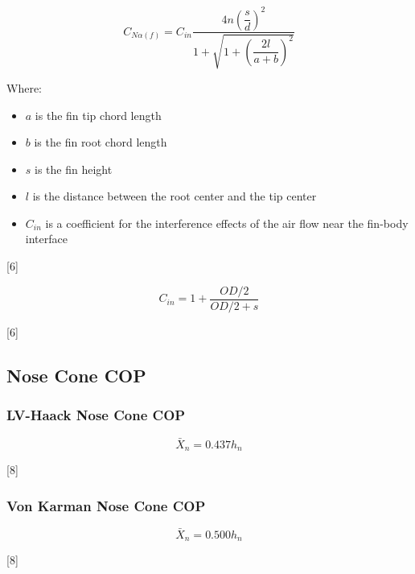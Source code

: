 \documentclass[]{article}
\providecommand{\tightlist}{%
  \setlength{\itemsep}{0pt}\setlength{\parskip}{0pt}}
\begin{document}
\begin{equation}
\label{eq_sd_fin_set}
C_{N \alpha(f)} = C_{in}\dfrac{4n \left( \dfrac{s}{d} \right)^2}{1 + \sqrt{1 + \left( \dfrac{2 l}{a + b} \right)^2}}
\end{equation}

Where:

\begin{itemize}
\tightlist
\item
  \(a\) is the fin tip chord length
\item
  \(b\) is the fin root chord length
\item
  \(s\) is the fin height
\item
  \(l\) is the distance between the root center and the tip center
\item
  \(C_{in}\) is a coefficient for the interference effects of the air
  flow near the fin-body interface
\end{itemize}

{[}6{]}

\begin{equation}
\label{eq_sd_interference}
C_{in} = 1 + \dfrac{OD/2}{OD/2 + s}
\end{equation}

{[}6{]}

\subsection{Nose Cone COP}\label{nose-cone-cop}

\subsubsection{LV-Haack Nose Cone COP}\label{lv-haack-nose-cone-cop}

\begin{equation}
\label{eq_cop_lv_haack}
\bar{X}_n = 0.437 h_n
\end{equation}

{[}8{]}

\subsubsection{Von Karman Nose Cone COP}\label{von-karman-nose-cone-cop}

\begin{equation}
\label{eq_cop_von_karman}
\bar{X}_n = 0.500 h_n
\end{equation}

{[}8{]}
\end{document}
